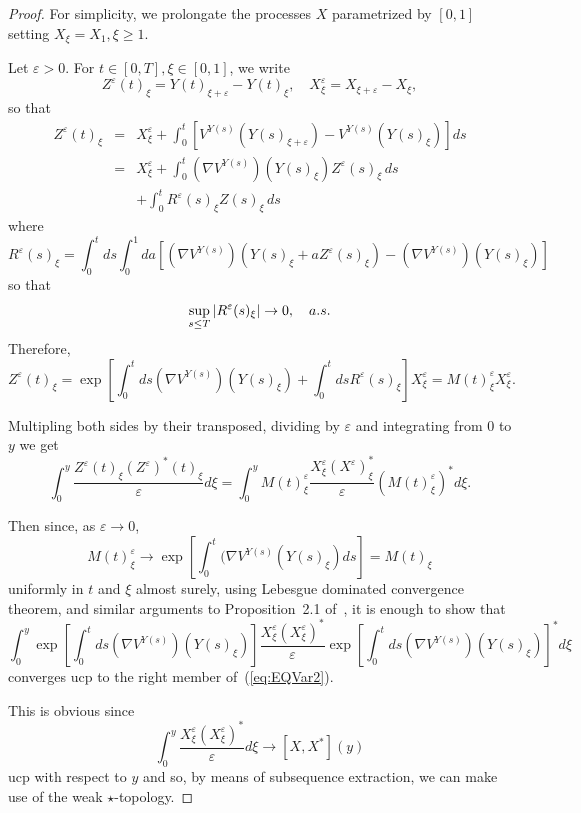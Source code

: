 \documentclass[a4paper,12pt,reqno]{amsart}
\begin{document}
\begin{proof}

For simplicity, we prolongate the processes $X$ parametrized by $[0,1]$ setting 
$X_\xi = X_1, \xi\ge 1$. 

Let $\varepsilon > 0$. 
For $t \in [0,T], \xi \in [0,1]$,
we write 
$$ Z^\varepsilon (t)_\xi =  Y(t)_{\xi + \varepsilon}  -  Y(t)_\xi , \quad X^\varepsilon_\xi  =  X_{\xi + \varepsilon}   - X_\xi, $$
so that 
\begin{eqnarray*}
   Z^\varepsilon (t)_\xi &=&  X^\varepsilon_\xi + \int_0^t  [
  V^{Y(s)}  (Y(s)_{\xi + \varepsilon} )-  V^{Y(s)} (Y(s)_\xi )  ]ds         \\  
&=&     X^\varepsilon_\xi + 
      \int_0^t  ( \nabla V^{Y(s)})  (Y(s)_\xi ) Z^\varepsilon (s)_\xi
  \,ds\\
& &  +  \int_0^t R^\varepsilon (s)_\xi Z(s)_\xi\,ds
 \end{eqnarray*}
where 
$$ R^\varepsilon (s)_\xi = \int_0^t ds  \int_0^1 da \left [ (\nabla V^{Y(s)}) (Y(s)_\xi  + a Z^\varepsilon (s)_\xi) - 
 ( \nabla V^{Y(s)})  (Y(s)_\xi)  \right] $$
so that 
$$ \sup_{s \le T} \vert R^\varepsilon (s)_\xi \vert  \rightarrow 0, \quad {\rm }a.s.  $$
Therefore,
$$ Z^\varepsilon (t)_\xi  = \exp \left[ \int_0^t ds  (\nabla V^{Y(s)})
  (Y(s)_\xi)+  \int_0^t ds R^\varepsilon (s)_\xi \right]
 X^\varepsilon_\xi  = M(t)^\varepsilon_\xi X^\varepsilon_\xi. $$

Multipling both sides by their transposed, dividing by $\varepsilon$ and integrating from $0$ to $y$
we get
$$ \int_0^y \frac{Z^\varepsilon(t)_\xi
  (Z^\varepsilon)^*(t)_\xi}{\varepsilon} d\xi = \int_0^y
  M(t)^\varepsilon_\xi 
 \frac{X^\varepsilon_\xi (X^\varepsilon)^*_\xi}{\varepsilon}
  (M(t)^\varepsilon_\xi)^* d\xi. $$

Then since, as $\varepsilon \to 0$, 
$$
M(t)^\varepsilon_\xi \to  \exp\left[\int_0^t (\nabla V^{Y(s)}(Y(s)_\xi)
  ds \right] = M(t)_\xi
$$
uniformly in $t$ and $\xi$ almost surely,  using Lebesgue dominated convergence theorem,
and similar arguments to Proposition~2.1 of~\cite{rv95},
it is enough to show that
$$ \int_0^y  
\exp \left[ \int_0^t ds (\nabla V^{Y(s)}) (Y(s)_\xi ) \right]
   \frac{X^\varepsilon_\xi (X^\varepsilon_\xi)^*}{\varepsilon} \exp
   \left[ \int_0^t ds (\nabla V^{Y(s)}) (Y(s)_\xi ) \right]^* d\xi $$
converges ucp  to the right member of~(\ref{eq:EQVar2}). 

This is obvious since 
$$ \int_0^y \frac{X^\varepsilon_\xi (X^\varepsilon_\xi)^*}{\varepsilon} d\xi \rightarrow  [X,X^*](y)$$
ucp with respect to $y$ and so, by means of subsequence extraction, we can
make use of the weak $\star$-topology. 
\end{proof}
\end{document}
